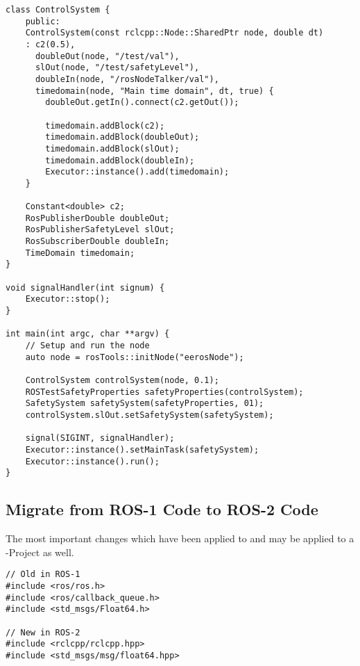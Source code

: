 \lstset{language=[ISO]C++}
\begin{lstlisting}[label=code:cpp-eeros-migration, caption={[EEROS-Migration]The main changes are in the initialization and the passthrough of the node as a shared pointer. Check the \textit{rosTest1} example for how this is done.}]
class ControlSystem {
    public:
    ControlSystem(const rclcpp::Node::SharedPtr node, double dt)
    : c2(0.5),
      doubleOut(node, "/test/val"),
      slOut(node, "/test/safetyLevel"),
      doubleIn(node, "/rosNodeTalker/val"),
      timedomain(node, "Main time domain", dt, true) {
        doubleOut.getIn().connect(c2.getOut());

        timedomain.addBlock(c2);
        timedomain.addBlock(doubleOut);
        timedomain.addBlock(slOut);
        timedomain.addBlock(doubleIn);
        Executor::instance().add(timedomain);
    }

    Constant<double> c2;
    RosPublisherDouble doubleOut;
    RosPublisherSafetyLevel slOut;
    RosSubscriberDouble doubleIn;
    TimeDomain timedomain;
}

void signalHandler(int signum) {
    Executor::stop();
}

int main(int argc, char **argv) {
    // Setup and run the node
    auto node = rosTools::initNode("eerosNode");

    ControlSystem controlSystem(node, 0.1);
    ROSTestSafetyProperties safetyProperties(controlSystem);
    SafetySystem safetySystem(safetyProperties, 01);
    controlSystem.slOut.setSafetySystem(safetySystem);

    signal(SIGINT, signalHandler);
    Executor::instance().setMainTask(safetySystem);
    Executor::instance().run();
}
\end{lstlisting}



\subsection[ROS-Migration]{Migrate from ROS-1 Code to ROS-2 Code} \label{sec:cpp-api-ros1-to-ros2}

The most important changes which have been applied to  and may be applied to a -Project as well.

\lstset{language=[ISO]C++}
\begin{lstlisting}[label=code:cpp-api-includes, caption={[Includes]The includes changed from ros.h (plus some others) to mainly only rclcpp/rclcpp.hpp. The messages are now in the subfolder ``msg'' and changed from CamelCase to snake\_case.}]
// Old in ROS-1
#include <ros/ros.h>
#include <ros/callback_queue.h>
#include <std_msgs/Float64.h>

// New in ROS-2
#include <rclcpp/rclcpp.hpp>
#include <std_msgs/msg/float64.hpp>
\end{lstlisting}


